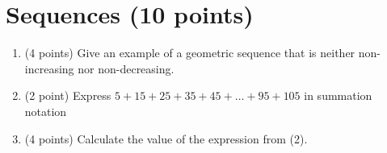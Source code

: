\documentclass[11pt]{article}
\def\sectionOneA#1{}
\def\sectionTwoA#1{#1}
\newcounter{pgpts}
\newcounter{cumpts}
\newcommand{\cnewpage}{\addtocounter{cumpts}{\value{pgpts}}\newpage\setcounter{pgpts}{0}}
\begin{document}





\cnewpage
\section{Sequences (10 points)}\addtocounter{pgpts}{10}
\begin{enumerate}
    \item (4 points) \sectionOneA{Give an example of a geometric sequence that is neither increasing nor decreasing.} \sectionTwoA{Give an example of a geometric sequence that is neither non-increasing nor non-decreasing.}  %
    \vspace{6cm}
    \item (2 point) %
    Express \sectionOneA{$8+16+24+32+40+\dots+88+96$}\sectionTwoA{$5+15+25+35+45+\dots+95+105$} in summation notation
    
    \vspace{4cm}
    \item (4 points) Calculate the value of the expression from (2).
    \vspace{3cm}
    \vspace{3cm}
\end{enumerate}
\end{document}
